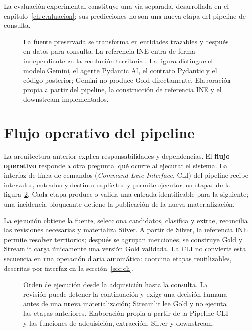 La evaluación experimental constituye una vía separada, desarrollada en el
capítulo~\ref{ch:evaluacion}; sus predicciones no son una nueva etapa del
pipeline de consulta.

\begin{figure}[p]
\centering

\caption[Arquitectura general del sistema]{La fuente preservada se transforma
en entidades trazables y después en datos para consulta. La referencia INE
entra de forma independiente en la resolución territorial. La figura distingue
el modelo Gemini, el agente Pydantic AI, el contrato Pydantic y el código
posterior; Gemini no produce Gold directamente. Elaboración propia a partir del
pipeline, la construcción de referencia INE y el downstream implementados.}
\label{fig:arquitectura-sistema}
\end{figure}

\section{Flujo operativo del pipeline}
\label{sec:flujo-operativo}
La arquitectura anterior explica responsabilidades y dependencias. El
\textbf{flujo operativo} responde a otra pregunta: qué ocurre al ejecutar el
sistema. La interfaz de línea de comandos
(\textit{Command-Line Interface}, CLI) del pipeline recibe intervalos,
entradas y destinos explícitos y
permite ejecutar las etapas de la figura~\ref{fig:flujo-operativo}. Cada etapa
produce o valida una entrada identificable para la siguiente; una incidencia
bloqueante detiene la publicación de la nueva materialización.

La ejecución obtiene la fuente, selecciona candidatos, clasifica y extrae,
reconcilia las revisiones necesarias y materializa Silver. A partir de Silver,
la referencia INE permite resolver territorios; después se agrupan menciones,
se construye Gold y Streamlit carga únicamente una versión Gold validada. La
CLI no convierte esta secuencia en una operación diaria automática: coordina
etapas reutilizables, descritas por interfaz en la
sección~\ref{sec:cli}.

\begin{figure}[p]
\centering

\caption[Flujo operativo del pipeline]{Orden de ejecución desde la adquisición
hasta la consulta. La revisión puede detener la continuación y exige una
decisión humana antes de una nueva materialización; Streamlit lee Gold y no
ejecuta las etapas anteriores. Elaboración propia a partir de la Pipeline CLI
y las funciones de adquisición, extracción, Silver y downstream.}
\label{fig:flujo-operativo}
\end{figure}

